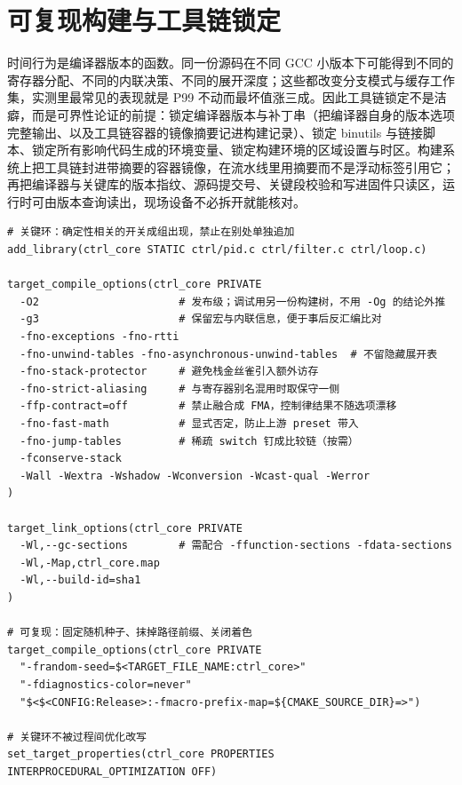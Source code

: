 \documentclass[12pt,a4paper,fontset=fandol]{ctexbook}
\begin{document}
\section{可复现构建与工具链锁定}
\label{sec:ch13-reprobuild}

时间行为是编译器版本的函数。同一份源码在不同 GCC 小版本下可能得到不同的寄存器分配、不同的内联决策、不同的展开深度；这些都改变分支模式与缓存工作集，实测里最常见的表现就是 P99 不动而最坏值涨三成。因此工具链锁定不是洁癖，而是可界性论证的前提：锁定编译器版本与补丁串（把编译器自身的版本选项完整输出、以及工具链容器的镜像摘要记进构建记录）、锁定 binutils 与链接脚本、锁定所有影响代码生成的环境变量、锁定构建环境的区域设置与时区。构建系统上把工具链封进带摘要的容器镜像，在流水线里用摘要而不是浮动标签引用它；再把编译器与关键库的版本指纹、源码提交号、关键段校验和写进固件只读区，运行时可由版本查询读出，现场设备不必拆开就能核对。

\begin{lstlisting}[style=cmakestyle,caption={CMake：硬实时目标的编译开关成组与可复现构建要点},label={lst:ch13-cmake}]
# 关键环：确定性相关的开关成组出现，禁止在别处单独追加
add_library(ctrl_core STATIC ctrl/pid.c ctrl/filter.c ctrl/loop.c)

target_compile_options(ctrl_core PRIVATE
  -O2                      # 发布级；调试用另一份构建树，不用 -Og 的结论外推
  -g3                      # 保留宏与内联信息，便于事后反汇编比对
  -fno-exceptions -fno-rtti
  -fno-unwind-tables -fno-asynchronous-unwind-tables  # 不留隐藏展开表
  -fno-stack-protector     # 避免栈金丝雀引入额外访存
  -fno-strict-aliasing     # 与寄存器别名混用时取保守一侧
  -ffp-contract=off        # 禁止融合成 FMA，控制律结果不随选项漂移
  -fno-fast-math           # 显式否定，防止上游 preset 带入
  -fno-jump-tables         # 稀疏 switch 钉成比较链（按需）
  -fconserve-stack
  -Wall -Wextra -Wshadow -Wconversion -Wcast-qual -Werror
)

target_link_options(ctrl_core PRIVATE
  -Wl,--gc-sections        # 需配合 -ffunction-sections -fdata-sections
  -Wl,-Map,ctrl_core.map
  -Wl,--build-id=sha1
)

# 可复现：固定随机种子、抹掉路径前缀、关闭着色
target_compile_options(ctrl_core PRIVATE
  "-frandom-seed=$<TARGET_FILE_NAME:ctrl_core>"
  "-fdiagnostics-color=never"
  "$<$<CONFIG:Release>:-fmacro-prefix-map=${CMAKE_SOURCE_DIR}=>")

# 关键环不被过程间优化改写
set_target_properties(ctrl_core PROPERTIES INTERPROCEDURAL_OPTIMIZATION OFF)
\end{lstlisting}
\end{document}
